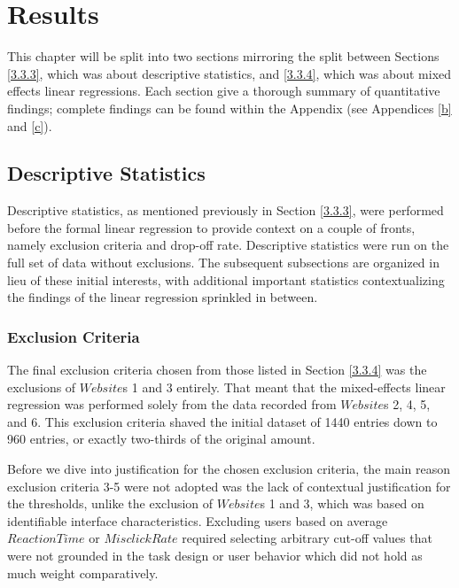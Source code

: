 \documentclass[12pt,twoside]{reedthesis}
\begin{document}
\chapter{Results}\label{4}

    This chapter will be split into two sections mirroring the split between Sections \ref{3.3.3}, which was about descriptive statistics, and \ref{3.3.4}, which was about mixed effects linear regressions. Each section give a thorough summary of quantitative findings; complete findings can be found within the Appendix (see Appendices \ref{b} and \ref{c}). 

    \section{Descriptive Statistics}\label{4.1}
    
    Descriptive statistics, as mentioned previously in Section \ref{3.3.3}, were performed before the formal linear regression to provide context on a couple of fronts, namely exclusion criteria and drop-off rate. Descriptive statistics were run on the full set of data without exclusions. The subsequent subsections are organized in lieu of these initial interests, with additional important statistics contextualizing the findings of the linear regression sprinkled in between.

    \subsection{Exclusion Criteria}\label{4.1.1}

    The final exclusion criteria chosen from those listed in Section \ref{3.3.4} was the exclusions of $Website$s 1 and 3 entirely. That meant that the mixed-effects linear regression was performed solely from the data recorded from $Website$s 2, 4, 5, and 6. This exclusion criteria shaved the initial dataset of 1440 entries down to 960 entries, or exactly two-thirds of the original amount. 


    Before we dive into justification for the chosen exclusion criteria, the main reason exclusion criteria 3-5 were not adopted was the lack of contextual justification for the thresholds, unlike the exclusion of $Website$s 1 and 3, which was based on identifiable interface characteristics. Excluding users based on average $ReactionTime$ or $MisclickRate$ required selecting arbitrary cut-off values that were not grounded in the task design or user behavior which did not hold as much weight comparatively.
\end{document}
